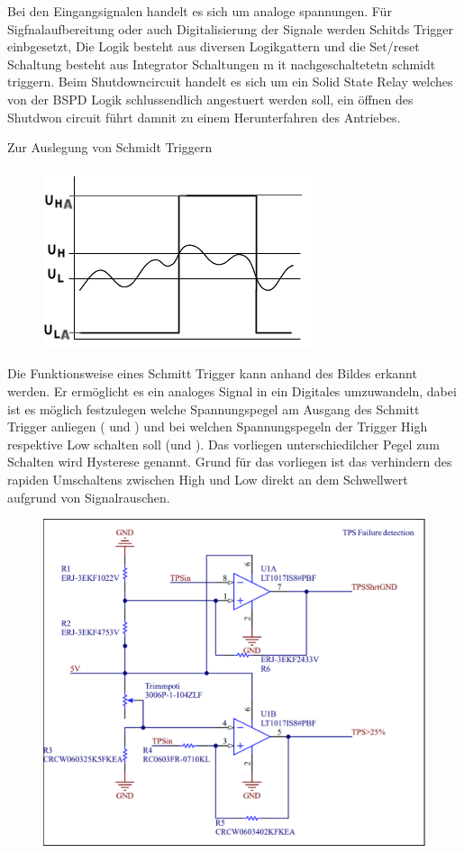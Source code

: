 Bei den Eingangsignalen handelt es sich um analoge spannungen. Für Sigfnalaufbereitung oder auch Digitalisierung der Signale werden Schitds Trigger einbgesetzt, Die Logik besteht aus diversen Logikgattern und die Set/reset Schaltung besteht aus Integrator Schaltungen m it nachgeschaltetetn schmidt triggern. Beim Shutdowncircuit handelt es sich um ein Solid State Relay welches von der BSPD Logik schlussendlich angestuert werden soll, ein öffnen des Shutdwon circuit führt damnit zu einem Herunterfahren des Antriebes.

Zur Auslegung von Schmidt Triggern
\begin{figure}
	\centering
	\includegraphics[width=0.5\linewidth]{bilder/Schmitt-trigger-diagramm.png}
	\caption{}
	\label{fig:schmitt-trigger-diagramm}
\end{figure}

Die Funktionsweise eines Schmitt Trigger kann anhand des Bildes erkannt werden. Er ermöglicht es ein analoges Signal in ein Digitales umzuwandeln, dabei ist es möglich festzulegen welche Spannungspegel am Ausgang des Schmitt Trigger anliegen ( und ) und bei welchen Spannungspegeln der Trigger High respektive Low schalten soll (und ). Das vorliegen unterschiedilcher Pegel zum Schalten wird Hysterese genannt. Grund für das vorliegen ist das verhindern des rapiden Umschaltens zwischen High und Low direkt an dem Schwellwert aufgrund von Signalrauschen.

\begin{figure}
	\centering
	\includegraphics[width=0.7\linewidth]{"bilder/TPS Failure detection"}
	\caption{}
	\label{fig:tps-failure-detection}
\end{figure}

